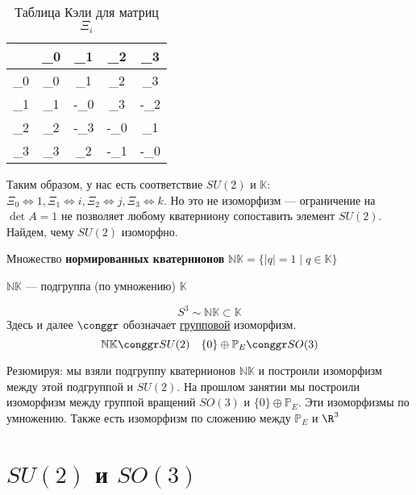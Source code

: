 \begin{table}[h]
	\centering
	\begin{tabular}{C|CCCC}
		\cdot & \Xi_0 & \Xi_1  & \Xi_2  & \Xi_3  \\ \hline
		\Xi_0 & \Xi_0 & \Xi_1  & \Xi_2  & \Xi_3  \\
		\Xi_1 & \Xi_1 & -\Xi_0 & \Xi_3  & -\Xi_2 \\
		\Xi_2 & \Xi_2 & -\Xi_3 & -\Xi_0 & \Xi_1  \\
		\Xi_3 & \Xi_3 & \Xi_2  & -\Xi_1 & -\Xi_0
	\end{tabular}
	\caption{Таблица Кэли для матриц \(\Xi_i\)}
\end{table}


Таким образом, у нас есть соответствие \(SU(2)\) и \(\mathbb{K}\): \(\Xi_0 \Leftrightarrow 1, \Xi_1 \Leftrightarrow i, \Xi_2 \Leftrightarrow j, \Xi_3 \Leftrightarrow k\).
Но это не изоморфизм --- ограничение на \(\det A = 1\) не позволяет любому кватерниону сопоставить элемент \(SU(2)\).
Найдем, чему \(SU(2)\) изоморфно.

\begin{definition}
	Множество \textbf{нормированных кватернионов} \(\mathbb{N}\mathbb{K} = \{|q| = 1 \mid q \in \mathbb{K}\}\)
\end{definition}
\begin{definition}
	\(\mathbb{N}\mathbb{K}\) --- подгруппа (по умножению) \(\mathbb{K}\)
\end{definition}

\[S^3 \sim \mathbb{N}\mathbb{K} \subset \mathbb{K}\]
Здесь и далее \(\conggr\) обозначает \underline{групповой} изоморфизм.
\[\mathbb{N}\mathbb{K} \conggr SU(2) \quad \{0\} \oplus \mathbb{P}_E \conggr SO(3)\]

Резюмируя: мы взяли подгруппу кватернионов \(\mathbb{N}\mathbb{K}\)
и построили изоморфизм между этой подгруппой и \(SU(2)\).
На прошлом занятии мы построили изоморфизм между группой вращений \(SO(3)\) и \(\{0\} \oplus \mathbb{P}_E\).
Эти изоморфизмы по умножению.
Также есть изоморфизм по сложению между \(\mathbb{P}_E\) и \(\R^3\)

\section{\(SU(2)\) и \(SO(3)\)}

